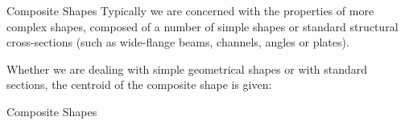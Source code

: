 \documentclass[9pt, xcolor={svgnames, x11names},professionalfonts]{beamer}
\begin{document}
\begin{frame}{Composite Shapes}
	Typically we are concerned with the properties of more complex shapes, composed of a number of simple shapes or standard structural cross-sections (such as wide-flange beams, channels, angles or plates).\parm

	Whether we are dealing with simple geometrical shapes or with standard sections, the centroid of the composite shape is given:
\end{frame}
\begin{frame}{Composite Shapes}
	\begin{myexam}[height=7cm]{}{}
		\vspace{0.5cm}
		\mini[0.55]{
			
		}
		\hfill
		\addtocounter{\tcbcounter}{-1}
	\end{myexam}
\end{frame}
\end{document}
